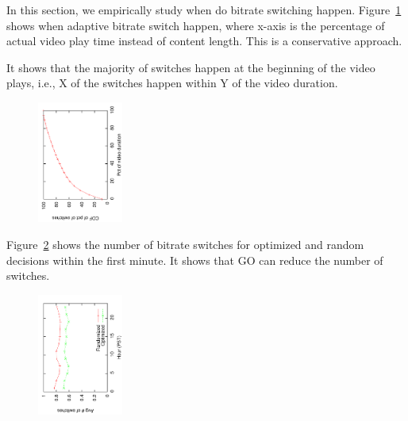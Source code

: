 

In this section, we empirically study when do bitrate switching happen. Figure~\ref{fig:switch-time-dist} shows when adaptive bitrate switch happen, where
x-axis is the percentage of actual video play time instead of content length. This is a conservative approach.

It shows that the majority of switches happen at 
the beginning of the video plays, i.e., X of the switches happen within Y of the video duration. 

\begin{figure}[h!]
\centering
 \includegraphics[width=0.25\textwidth, angle=270] {figures/switch-time-dist.pdf}
\label{fig:switch-time-dist}
\end{figure}




Figure~\ref{fig:reduce-switch} shows the number of bitrate switches for optimized and random decisions within the first minute. 
It shows that GO can reduce the number of switches.

\begin{figure}[h!]
\centering
 \includegraphics[width=0.25\textwidth, angle=270] {figures/eval-reduceswitch.pdf}
\label{fig:reduce-switch}
\end{figure}

